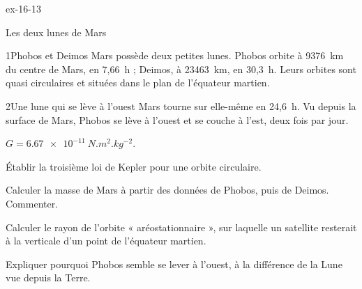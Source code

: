 \begin{blocLivre}{ex-16-13}
\begin{exercice}[3]{Les deux lunes de Mars}
\begin{docu}{1}{Phobos et Deimos}
Mars possède deux petites lunes. Phobos orbite à \qty{9376}{km} du centre de Mars, en 7,66~h ; Deimos, à \qty{23463}{km}, en
30,3~h. Leurs orbites sont quasi circulaires et situées dans le plan de l'équateur martien.
\end{docu}
\begin{docu}{2}{Une lune qui se lève à l'ouest}
Mars tourne sur elle-même en 24,6~h. Vu depuis la surface de Mars, Phobos se lève à l'ouest et se couche à l'est, deux
fois par jour.
\end{docu}
\begin{donnees}
$G=\qty{6,67e-11}{N.m^2.kg^{-2}}$.
\end{donnees}
\begin{questions}
\item Établir la troisième loi de Kepler pour une orbite circulaire.
\item Calculer la masse de Mars à partir des données de Phobos, puis de Deimos. Commenter.
\item \initiative Calculer le rayon de l'orbite « aréostationnaire », sur laquelle un satellite resterait à la verticale
d'un point de l'équateur martien.
\item Expliquer pourquoi Phobos semble se lever à l'ouest, à la différence de la Lune vue depuis la Terre.
\end{questions}
\end{exercice}
\end{blocLivre}
